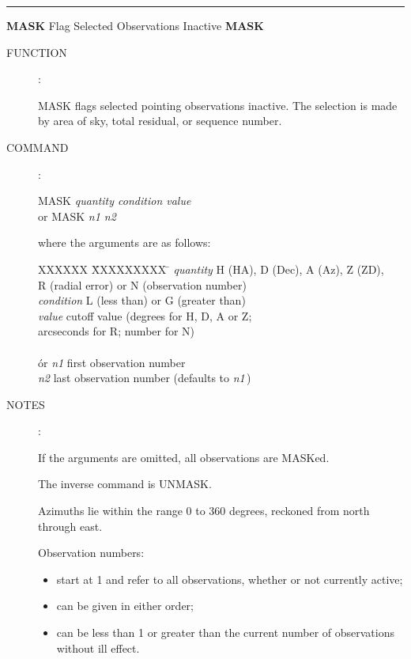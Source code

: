 \goodbreak
\rule{\textwidth}{0.3mm}
{\Large {\bf MASK} \hfill Flag Selected Observations Inactive \hfill
                                                         {\bf MASK}}
\begin{description}
\item [FUNCTION]:

MASK flags selected pointing observations inactive.  The selection
is made by area of sky, total residual, or sequence number.

\item [COMMAND]:

\begin{cmd}
\> \> MASK {\it quantity  condition  value } \\
\> or \> MASK {\it n1  n2 }
\end{cmd}

where the arguments are as follows:
\begin{tabbing}
XXXXXX \= XXXXXXXXX \= \kill
\> {\it quantity} \> H (HA), D (Dec), A (Az), Z (ZD), \\
\>                \> R (radial error) or N (observation number) \\
\> {\it condition} \> L (less than) or G (greater than) \\
\> {\it value} \> cutoff value (degrees for H, D, A or Z; \\
\>             \> arcseconds for R; number for N) \\ \\
\' or \> {\it n1} \> first observation number \\
      \> {\it n2} \> last observation number (defaults to {\it n1}\,)
\end{tabbing}

\item [NOTES]:

If the arguments are omitted, all observations are MASKed.

The inverse command is UNMASK.

Azimuths lie within the range 0 to 360 degrees, reckoned
from north through east.

\goodbreak
Observation numbers:
\begin{itemize}
\item start at 1 and refer to all observations, whether or not
      currently active;
\item can be given in either order;
\item can be less than 1 or greater than the current number of
      observations without ill effect.
\end{itemize}


\end{description}
